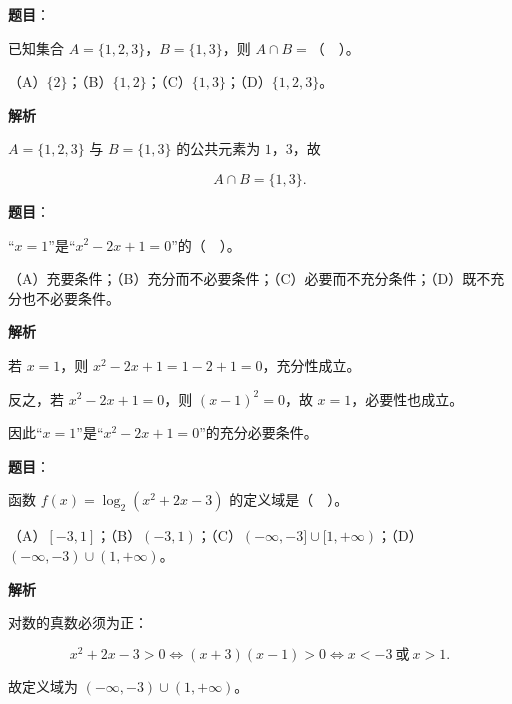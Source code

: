 


\begin{answer}

\textbf{题目}：

已知集合 $A=\{1,2,3\}$，$B=\{1,3\}$，则 $A\cap B=$（　）。

（A）$\{2\}$；（B）$\{1,2\}$；（C）$\{1,3\}$；（D）$\{1,2,3\}$。

\textbf{解析}

$A=\{1,2,3\}$ 与 $B=\{1,3\}$ 的公共元素为 $1$，$3$，故

\nopagebreak[4]
\[
A\cap B=\{1,3\}.
\]


\end{answer}
\begin{answer}

\textbf{题目}：

“$x=1$”是“$x^{2}-2x+1=0$”的（　）。

（A）充要条件；（B）充分而不必要条件；（C）必要而不充分条件；（D）既不充分也不必要条件。

\textbf{解析}

若 $x=1$，则 $x^{2}-2x+1=1-2+1=0$，充分性成立。

反之，若 $x^{2}-2x+1=0$，则 $(x-1)^{2}=0$，故 $x=1$，必要性也成立。

因此“$x=1$”是“$x^{2}-2x+1=0$”的充分必要条件。


\end{answer}
\begin{answer}

\textbf{题目}：

函数 $f(x)=\log_{2}(x^{2}+2x-3)$ 的定义域是（　）。

（A）$[-3,1]$；（B）$(-3,1)$；（C）$(-\infty,-3]\cup[1,+\infty)$；（D）$(-\infty,-3)\cup(1,+\infty)$。

\textbf{解析}

对数的真数必须为正：

\nopagebreak[4]
\[
x^{2}+2x-3>0\iff (x+3)(x-1)>0\iff x<-3\ \text{或}\ x>1.
\]

故定义域为 $(-\infty,-3)\cup(1,+\infty)$。


\end{answer}
